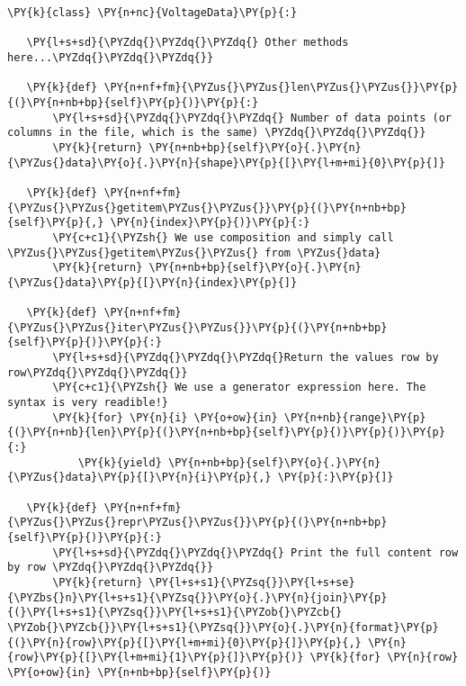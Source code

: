 \begin{Verbatim}[label=\makebox{\url{https://github.com/lucabaldini/cmepda/tree/master/slides/latex/snippets/voltage\_data\_2.py}},commandchars=\\\{\}]
\PY{k}{class} \PY{n+nc}{VoltageData}\PY{p}{:}

   \PY{l+s+sd}{\PYZdq{}\PYZdq{}\PYZdq{} Other methods here...\PYZdq{}\PYZdq{}\PYZdq{}}
   
   \PY{k}{def} \PY{n+nf+fm}{\PYZus{}\PYZus{}len\PYZus{}\PYZus{}}\PY{p}{(}\PY{n+nb+bp}{self}\PY{p}{)}\PY{p}{:}
       \PY{l+s+sd}{\PYZdq{}\PYZdq{}\PYZdq{} Number of data points (or columns in the file, which is the same) \PYZdq{}\PYZdq{}\PYZdq{}}
       \PY{k}{return} \PY{n+nb+bp}{self}\PY{o}{.}\PY{n}{\PYZus{}data}\PY{o}{.}\PY{n}{shape}\PY{p}{[}\PY{l+m+mi}{0}\PY{p}{]}
   
   \PY{k}{def} \PY{n+nf+fm}{\PYZus{}\PYZus{}getitem\PYZus{}\PYZus{}}\PY{p}{(}\PY{n+nb+bp}{self}\PY{p}{,} \PY{n}{index}\PY{p}{)}\PY{p}{:}
       \PY{c+c1}{\PYZsh{} We use composition and simply call \PYZus{}\PYZus{}getitem\PYZus{}\PYZus{} from \PYZus{}data}
       \PY{k}{return} \PY{n+nb+bp}{self}\PY{o}{.}\PY{n}{\PYZus{}data}\PY{p}{[}\PY{n}{index}\PY{p}{]}
   
   \PY{k}{def} \PY{n+nf+fm}{\PYZus{}\PYZus{}iter\PYZus{}\PYZus{}}\PY{p}{(}\PY{n+nb+bp}{self}\PY{p}{)}\PY{p}{:}
       \PY{l+s+sd}{\PYZdq{}\PYZdq{}\PYZdq{}Return the values row by row\PYZdq{}\PYZdq{}\PYZdq{}}
       \PY{c+c1}{\PYZsh{} We use a generator expression here. The syntax is very readible!}
       \PY{k}{for} \PY{n}{i} \PY{o+ow}{in} \PY{n+nb}{range}\PY{p}{(}\PY{n+nb}{len}\PY{p}{(}\PY{n+nb+bp}{self}\PY{p}{)}\PY{p}{)}\PY{p}{:}
           \PY{k}{yield} \PY{n+nb+bp}{self}\PY{o}{.}\PY{n}{\PYZus{}data}\PY{p}{[}\PY{n}{i}\PY{p}{,} \PY{p}{:}\PY{p}{]} 
           
   \PY{k}{def} \PY{n+nf+fm}{\PYZus{}\PYZus{}repr\PYZus{}\PYZus{}}\PY{p}{(}\PY{n+nb+bp}{self}\PY{p}{)}\PY{p}{:}
       \PY{l+s+sd}{\PYZdq{}\PYZdq{}\PYZdq{} Print the full content row by row \PYZdq{}\PYZdq{}\PYZdq{}}
       \PY{k}{return} \PY{l+s+s1}{\PYZsq{}}\PY{l+s+se}{\PYZbs{}n}\PY{l+s+s1}{\PYZsq{}}\PY{o}{.}\PY{n}{join}\PY{p}{(}\PY{l+s+s1}{\PYZsq{}}\PY{l+s+s1}{\PYZob{}\PYZcb{} \PYZob{}\PYZcb{}}\PY{l+s+s1}{\PYZsq{}}\PY{o}{.}\PY{n}{format}\PY{p}{(}\PY{n}{row}\PY{p}{[}\PY{l+m+mi}{0}\PY{p}{]}\PY{p}{,} \PY{n}{row}\PY{p}{[}\PY{l+m+mi}{1}\PY{p}{]}\PY{p}{)} \PY{k}{for} \PY{n}{row} \PY{o+ow}{in} \PY{n+nb+bp}{self}\PY{p}{)}
   

\end{Verbatim}
